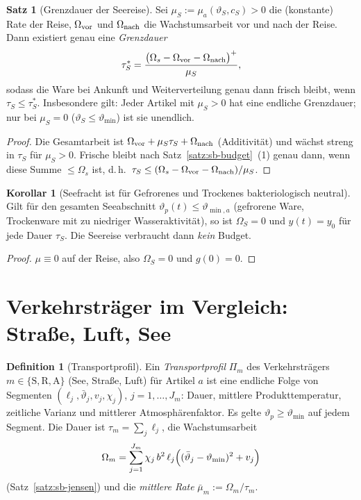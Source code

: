 \documentclass[a4paper, 12pt, twoside, openright]{report}
\theoremstyle{definition}
\newtheorem{definition}[theorem]{Definition}
\theoremstyle{definition}
\newtheorem{satz}{Satz}[chapter]
\newtheorem{korollar}{Korollar}[chapter]
\begin{document}
\begin{satz}[Grenzdauer der Seereise]\label{satz:sb-grenzdauer}
Sei $\mu_S:=\mu_a(\vartheta_S,c_S)>0$ die (konstante) Rate der Reise, $\Omega_{\rm vor}$ und
$\Omega_{\rm nach}$ die Wachstumsarbeit vor und nach der Reise. Dann existiert genau eine
\emph{Grenzdauer}
\begin{equation}
  \tau_S^\ast=\frac{\bigl(\Omega_s-\Omega_{\rm vor}-\Omega_{\rm nach}\bigr)^{+}}{\mu_S},
  \label{eq:sb-tauS}
\end{equation}
sodass die Ware bei Ankunft und Weiterverteilung genau dann frisch bleibt, wenn
$\tau_S\le\tau_S^\ast$. Insbesondere gilt: Jeder Artikel mit $\mu_S>0$ hat eine endliche
Grenzdauer; nur bei $\mu_S=0$ ($\vartheta_S\le\vartheta_{\min}$) ist sie unendlich.
\end{satz}

\begin{proof}
Die Gesamtarbeit ist $\Omega_{\rm vor}+\mu_S\tau_S+\Omega_{\rm nach}$ (Additivität) und
wächst streng in $\tau_S$ für $\mu_S>0$. Frische bleibt nach Satz~\ref{satz:sb-budget}~(1)
genau dann, wenn diese Summe $\le\Omega_s$ ist, d.\,h.\ $\tau_S\le(\Omega_s-\Omega_{\rm vor}-\Omega_{\rm nach})/\mu_S$.
\end{proof}

\begin{korollar}[Seefracht ist für Gefrorenes und Trockenes bakteriologisch neutral]\label{kor:sb-gefroren}
Gilt für den gesamten Seeabschnitt $\vartheta_p(t)\le\vartheta_{\min,a}$ (gefrorene Ware,
Trockenware mit zu niedriger Wasseraktivität), so ist $\Omega_S=0$ und $y(t)=y_0$ für jede
Dauer $\tau_S$. Die Seereise verbraucht dann \emph{kein} Budget.
\end{korollar}

\begin{proof}
$\mu\equiv0$ auf der Reise, also $\Omega_S=0$ und $g(0)=0$.
\end{proof}

\section{Verkehrsträger im Vergleich: Straße, Luft, See}
\label{sec:sb-modes}

\begin{definition}[Transportprofil]\label{def:sb-profil}
Ein \emph{Transportprofil} $\Pi_m$ des Verkehrsträgers $m\in\{\mathrm S,\mathrm R,\mathrm A\}$
(See, Straße, Luft) für Artikel $a$ ist eine endliche Folge von Segmenten
$(\ell_j,\bar\vartheta_j,v_j,\chi_j)$, $j=1,\dots,J_m$: Dauer, mittlere Produkttemperatur,
zeitliche Varianz und mittlerer Atmosphärenfaktor. Es gelte $\vartheta_p\ge\vartheta_{\min}$
auf jedem Segment. Die Dauer ist $\tau_m=\sum_j\ell_j$, die Wachstumsarbeit
\begin{equation}
  \Omega_m=\sum_{j=1}^{J_m}\chi_j\,b^2\,\ell_j\Bigl((\bar\vartheta_j-\vartheta_{\min})^2+v_j\Bigr)
  \label{eq:sb-Om}
\end{equation}
(Satz~\ref{satz:sb-jensen}) und die \emph{mittlere Rate} $\bar\mu_m:=\Omega_m/\tau_m$.
\end{definition}
\end{document}
